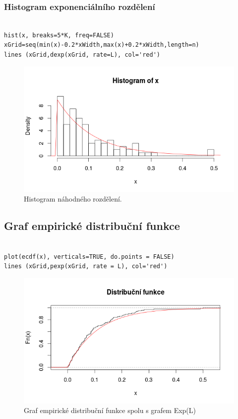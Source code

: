 \documentclass[12pt]{article}
\begin{document}
\subsubsection{Histogram exponenciálního rozdělení}
  \begin{lstlisting}[frame=single]  % Start your code-block
  
hist(x, breaks=5*K, freq=FALSE)
xGrid=seq(min(x)-0.2*xWidth,max(x)+0.2*xWidth,length=n) 
lines (xGrid,dexp(xGrid, rate=L), col='red') 
\end{lstlisting}
\begin{figure}[ht!]
	\includegraphics[scale=0.5]{img/histogram_x}\centering
	\caption{Histogram náhodného rozdělení.}
	\label{obr:sikme}
\end{figure}

\subsection{Graf empirické distribuční funkce}
  \begin{lstlisting}[frame=single]  % Start your code-block
  
plot(ecdf(x), verticals=TRUE, do.points = FALSE)
lines (xGrid,pexp(xGrid, rate = L), col='red')
\end{lstlisting}
\begin{figure}[ht!]
	\includegraphics[scale=0.5]{img/1_3empiricka_distribucni_funkce}\centering
	\caption{Graf empirické distribuční funkce spolu s grafem Exp(L)}
	\label{obr:sikme}
\end{figure}
\end{document}
